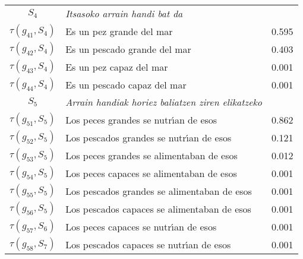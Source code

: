 \documentclass[25pt, a0paper, portrait, margin=0mm, innermargin=15mm,blockverticalspace=15mm, colspace=15mm, subcolspace=8mm]{tikzposter}
\begin{document}
\begin{columns}
{\begin{center}
\begin{tabular}{|c|l|r|}
     \hline %
     \(S_4\) & \emph{Itsasoko arrain handi bat da} & \\
                         $\tau(g_{41},S_4)$ & Es un pez grande del mar & 0.595 \\
                         $\tau(g_{42},S_4)$ & Es un pescado grande del mar & 0.403 \\
                         $\tau(g_{43},S_4)$ & Es un pez capaz del mar & 0.001 \\
                         $\tau(g_{44},S_4)$ & Es un pescado capaz del mar & 0.001 \\
     \hline %
     $S_5$ &  \emph{Arrain handiak horiez baliatzen ziren elikatzeko} &  \\
                         $\tau(g_{51},S_5)$ & Los peces grandes se nutr\'{\i}an de esos & 0.862 \\
                         $\tau(g_{52},S_5)$ & Los pescados grandes se nutr\'{\i}an de esos & 0.121 \\
                         $\tau(g_{53},S_5)$ & Los peces grandes se alimentaban de esos & 0.012 \\
                         $\tau(g_{54},S_5)$ & Los peces capaces se alimentaban de esos & 0.001 \\
                         $\tau(g_{55},S_5)$ & Los pescados grandes se alimentaban de esos & 0.001 \\
                         $\tau(g_{56},S_5)$ & Los pescados capaces se alimentaban de esos & 0.001 \\
                         $\tau(g_{57},S_6)$ & Los peces capaces se nutr\'{\i}an de esos & 0.001 \\
                         $\tau(g_{58},S_7)$ & Los pescados capaces se nutr\'{\i}an de esos & 0.001 \\
     \hline
   
   \end{tabular}
\end{center}
}
\end{columns}
\end{document}
